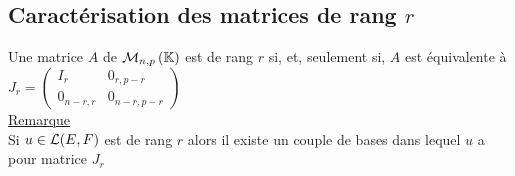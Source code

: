 \subsection{Caractérisation des matrices de rang \(r\)}
\begin{defprop}
    Une matrice \(A\) de \(\M{n,p}\) est de rang \(r\) si, et, seulement si, \(A\) est équivalente à \(J_r =
    \left( \begin{array}{cc}
    I_r & 0_{r,p-r} \\
    0_{n-r,r} & 0_{n-r,p-r}        
    \end{array} \right)\) \\
    \underline{Remarque} \\
    Si \(u \in \cal{L}(E, F )\) est de rang \(r\) alors il existe un couple de bases dans lequel \(u\) a pour matrice \(J_r\)
\end{defprop}

